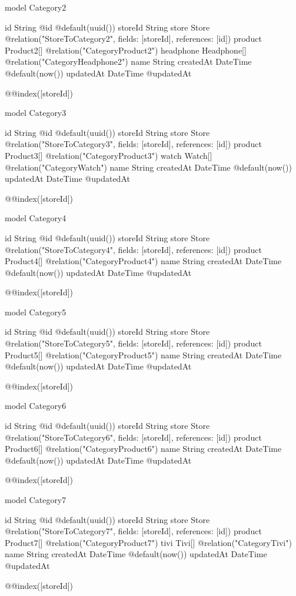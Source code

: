 model Category2 {
  id        String      @id @default(uuid())
  storeId   String
  store     Store       @relation("StoreToCategory2", fields: [storeId], references: [id])
  product   Product2[]  @relation("CategoryProduct2")
  headphone   Headphone[] @relation("CategoryHeadphone2")
  name      String
  createdAt DateTime    @default(now())
  updatedAt DateTime    @updatedAt

  @@index([storeId])
}

model Category3 {
  id        String     @id @default(uuid())
  storeId   String
  store     Store      @relation("StoreToCategory3", fields: [storeId], references: [id])
  product   Product3[] @relation("CategoryProduct3")
  watch     Watch[]    @relation("CategoryWatch")
  name      String
  createdAt DateTime   @default(now())
  updatedAt DateTime   @updatedAt

  @@index([storeId])
}

model Category4 {
  id        String     @id @default(uuid())
  storeId   String
  store     Store      @relation("StoreToCategory4", fields: [storeId], references: [id])
  product   Product4[] @relation("CategoryProduct4")
  name      String
  createdAt DateTime   @default(now())
  updatedAt DateTime   @updatedAt

  @@index([storeId])
}

model Category5 {
  id        String     @id @default(uuid())
  storeId   String
  store     Store      @relation("StoreToCategory5", fields: [storeId], references: [id])
  product   Product5[] @relation("CategoryProduct5")
  name      String
  createdAt DateTime   @default(now())
  updatedAt DateTime   @updatedAt

  @@index([storeId])
}

model Category6 {
  id        String     @id @default(uuid())
  storeId   String
  store     Store      @relation("StoreToCategory6", fields: [storeId], references: [id])
  product   Product6[] @relation("CategoryProduct6")
  name      String
  createdAt DateTime   @default(now())
  updatedAt DateTime   @updatedAt

  @@index([storeId])
}

model Category7 {
  id        String     @id @default(uuid())
  storeId   String
  store     Store      @relation("StoreToCategory7", fields: [storeId], references: [id])
  product   Product7[] @relation("CategoryProduct7")
  tivi      Tivi[]     @relation("CategoryTivi")
  name      String
  createdAt DateTime   @default(now())
  updatedAt DateTime   @updatedAt

  @@index([storeId])
}


